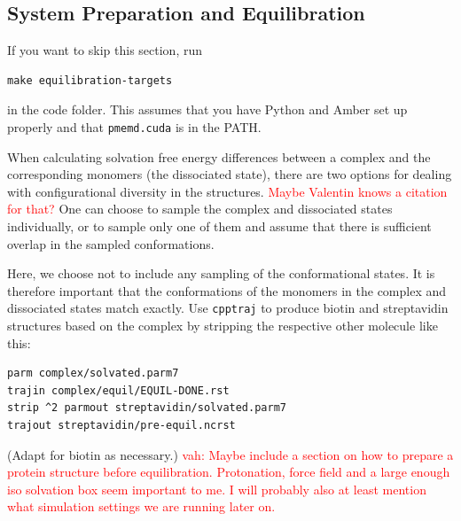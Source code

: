 \documentclass[9pt,tutorial]{livecoms}
\newcommand{\software}{\texttt}
\newcommand{\todo}{\textcolor{red}}
\begin{document}
\subsection{System Preparation and Equilibration}
If you want to skip this section, run 
\begin{lstlisting}
make equilibration-targets
\end{lstlisting}
in the code folder. This assumes that you have Python and Amber set up properly and that \software{pmemd.cuda} is in the PATH.

When calculating solvation free energy differences between a complex and the corresponding monomers (the dissociated state), there are two options for dealing with configurational diversity in the structures.
\todo{Maybe Valentin knows a citation for that?}
One can choose to sample the complex and dissociated states individually, or to sample only one of them and assume that there is sufficient overlap in the sampled conformations.

Here, we choose not to include any sampling of the conformational states. 
It is therefore important that the conformations of the monomers in the complex and dissociated states match exactly. 
Use \software{cpptraj} to produce biotin and streptavidin structures based on the complex by stripping the respective other molecule like this:
\begin{lstlisting}
parm complex/solvated.parm7
trajin complex/equil/EQUIL-DONE.rst
strip ^2 parmout streptavidin/solvated.parm7
trajout streptavidin/pre-equil.ncrst
\end{lstlisting}
(Adapt for biotin as necessary.)
\todo{vah: Maybe include a section on how to prepare a protein structure before equilibration. Protonation, force field and a large enough iso solvation box seem important to me. I will probably also at least mention what simulation settings we are running later on.}
\end{document}
